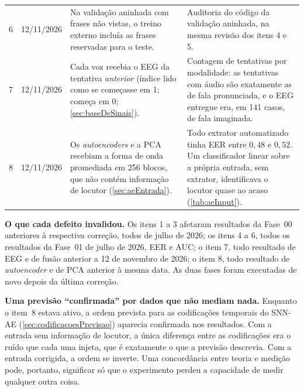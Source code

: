 \begin{apendicesenv}
{\begin{longtable}{@{}Y{0.04\textwidth}Y{0.13\textwidth}Y{0.36\textwidth}Y{0.39\textwidth}@{}}
			6 & 12/11/2026 & Na validação aninhada com frases não vistas, o treino externo incluía as frases reservadas para o teste. & Auditoria do código da validação aninhada, na mesma revisão dos itens 4 e 5. \\
			7 & 12/11/2026 & Cada voz recebia o \ac{EEG} da tentativa \emph{anterior} (índice lido como se começasse em 1; começa em 0; \autoref{sec:baseDeSinais}). & Contagem de tentativas por modalidade: as tentativas com áudio são exatamente as de fala pronunciada, e o \ac{EEG} entregue era, em 141 casos, de fala imaginada. \\
			8 & 12/11/2026 & Os \textit{autoencoders} e a \ac{PCA} recebiam a forma de onda promediada em 256 blocos, que não contém informação de locutor (\autoref{sec:aeEntrada}). & Todo extrator automatizado tinha \ac{EER} entre $0{,}48$ e $0{,}52$. Um classificador linear sobre a própria entrada, sem extrator, identificava o locutor quase ao acaso (\autoref{tab:aeInput}). \\
		\end{longtable}
		}
		\vspace{36pt}

		\par \textbf{O que cada defeito invalidou.} Os itens 1 a 3 afetaram
		resultados da Fase~00 anteriores à respectiva correção, todos de julho de 2026; os itens 4 a 6, todos os
		resultados da Fase~01 de julho de 2026, \ac{EER} e \ac{AUC}; o item 7, todo
		resultado de \ac{EEG} e de fusão anterior a 12 de novembro de 2026; o item 8,
		todo resultado de \textit{autoencoder} e de \ac{PCA} anterior à mesma data.
		As duas fases foram executadas de novo depois da última correção.

		\par \textbf{Uma previsão ``confirmada'' por dados que não mediam nada.}
		Enquanto o item~8 estava ativo, a ordem prevista para as codificações temporais
		do \ac{SNN}-AE (\autoref{sec:codificacoesPrevisao}) aparecia confirmada nos
		resultados. Com a entrada sem informação de locutor, a única diferença entre as
		codificações era o ruído que cada uma injeta, que é exatamente o que a previsão
		descrevia. Com a entrada corrigida, a ordem se inverte. Uma concordância entre
		teoria e medição pode, portanto, significar só que o experimento perdeu a
		capacidade de medir qualquer outra coisa.


\end{apendicesenv}

